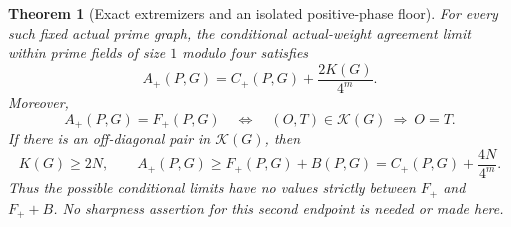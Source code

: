 \documentclass[11pt]{article}
\newtheorem{theorem}{Theorem}[section]
\begin{document}
\begin{theorem}[Exact extremizers and an isolated positive-phase floor]
\label{thm:native-coincidence-gap}
For every such fixed actual prime graph, the conditional actual-weight
agreement limit within prime fields of size \(1\) modulo four satisfies
\begin{equation}\label{eq:native-exact-square-count}
              A_+(P,G)=C_+(P,G)+\frac{2K(G)}{4^m}.
\end{equation}
Moreover,
\begin{equation}\label{eq:native-exact-floor-criterion}
 A_+(P,G)=F_+(P,G)
 \quad\Longleftrightarrow\quad
       (O,T)\in\mathcal K(G)\ \Longrightarrow\ O=T.
\end{equation}
If there is an off-diagonal pair in \(\mathcal K(G)\), then
\begin{equation}\label{eq:native-isolated-floor}
 K(G)\geq2N,\qquad
 A_+(P,G)\geq F_+(P,G)+B(P,G)
             =C_+(P,G)+\frac{4N}{4^m}.
\end{equation}
Thus the possible conditional limits have no values strictly between
\(F_+\) and \(F_++B\). No sharpness assertion for this second endpoint
is needed or made here.
\end{theorem}
\end{document}
